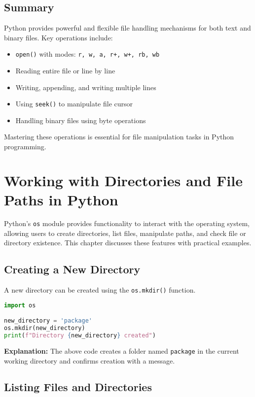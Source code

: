 \section{Summary}

Python provides powerful and flexible file handling mechanisms for both text and binary files. Key operations include:

\begin{itemize}
    \item \texttt{open()} with modes: \texttt{r, w, a, r+, w+, rb, wb}
    \item Reading entire file or line by line
    \item Writing, appending, and writing multiple lines
    \item Using \texttt{seek()} to manipulate file cursor
    \item Handling binary files using byte operations
\end{itemize}

Mastering these operations is essential for file manipulation tasks in Python programming.

\chapter{Working with Directories and File Paths in Python}

Python's \texttt{os} module provides functionality to interact with the operating system, allowing users to create directories, list files, manipulate paths, and check file or directory existence. This chapter discusses these features with practical examples.

\section{Creating a New Directory}

A new directory can be created using the \texttt{os.mkdir()} function.

\begin{lstlisting}[language=Python]
import os

new_directory = 'package'
os.mkdir(new_directory)
print(f"Directory {new_directory} created")
\end{lstlisting}

\textbf{Explanation:} The above code creates a folder named \texttt{package} in the current working directory and confirms creation with a message.

\section{Listing Files and Directories}

